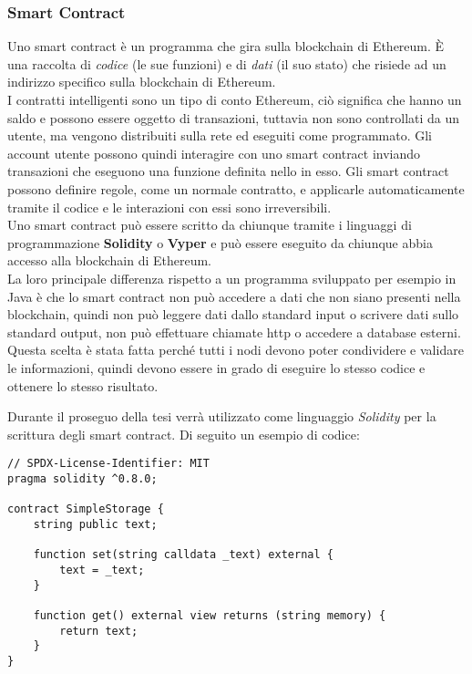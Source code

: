 \subsubsection{Smart Contract}
Uno smart contract è un programma che gira sulla blockchain di Ethereum. È una
raccolta di \textit{codice} (le sue funzioni) e di \textit{dati} (il suo stato)
che risiede ad un indirizzo specifico sulla blockchain di Ethereum. \\
I contratti intelligenti sono un tipo di conto Ethereum, ciò significa che
hanno un saldo e possono essere oggetto di transazioni, tuttavia non sono
controllati da un utente, ma vengono distribuiti sulla rete ed eseguiti come
programmato. Gli account utente possono quindi interagire con uno smart
contract inviando transazioni che eseguono una funzione definita nello in esso.
Gli smart contract possono definire regole, come un normale contratto,
e applicarle automaticamente tramite il codice e le interazioni con essi sono
irreversibili. \\
Uno smart contract può essere scritto da chiunque tramite i linguaggi di
programmazione \textbf{Solidity} o \textbf{Vyper} e può essere eseguito da
chiunque abbia accesso alla blockchain di Ethereum. \\
La loro principale differenza rispetto a un programma sviluppato per esempio in
Java è che lo smart contract non può accedere a dati che non siano presenti
nella blockchain, quindi non può leggere dati dallo standard input o scrivere
dati sullo standard output, non può effettuare chiamate http o accedere a
database esterni. Questa scelta è stata fatta perché tutti i nodi devono poter
condividere e validare le informazioni, quindi devono essere in grado di
eseguire lo stesso codice e ottenere lo stesso risultato.

Durante il proseguo della tesi verrà utilizzato come linguaggio \textit{Solidity}
per la scrittura degli smart contract. Di seguito un esempio di codice:

\newpage

\begin{lstlisting}[language=Solidity]
// SPDX-License-Identifier: MIT
pragma solidity ^0.8.0;

contract SimpleStorage {
    string public text;

    function set(string calldata _text) external {
        text = _text;
    }

    function get() external view returns (string memory) {
        return text;
    }
}
\end{lstlisting}

